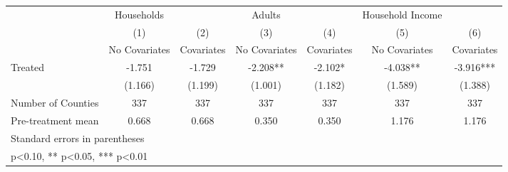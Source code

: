{
\def\sym#1{\ifmmode^{#1}\else\(^{#1}\)\fi}
\begin{tabular}{l*{6}{c}}
\hline\hline
            &  Households   &               &      Adults   &               &Household Income   &               \\
            &\multicolumn{1}{c}{(1)}&\multicolumn{1}{c}{(2)}&\multicolumn{1}{c}{(3)}&\multicolumn{1}{c}{(4)}&\multicolumn{1}{c}{(5)}&\multicolumn{1}{c}{(6)}\\
            &\multicolumn{1}{c}{No Covariates}&\multicolumn{1}{c}{Covariates}&\multicolumn{1}{c}{No Covariates}&\multicolumn{1}{c}{Covariates}&\multicolumn{1}{c}{No Covariates}&\multicolumn{1}{c}{Covariates}\\
\hline
Treated     &      -1.751   &      -1.729   &      -2.208** &      -2.102*  &      -4.038** &      -3.916***\\
            &     (1.166)   &     (1.199)   &     (1.001)   &     (1.182)   &     (1.589)   &     (1.388)   \\
\hline
Number of Counties&         337   &         337   &         337   &         337   &         337   &         337   \\
Pre-treatment mean&       0.668   &       0.668   &       0.350   &       0.350   &       1.176   &       1.176   \\
\hline\hline
\multicolumn{7}{l}{\footnotesize Standard errors in parentheses}\\
\multicolumn{7}{l}{\footnotesize * p<0.10, ** p<0.05, *** p<0.01}\\
\end{tabular}
}
